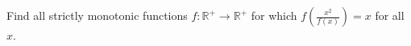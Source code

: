 Find all strictly monotonic functions \(f\colon  \mathbb{R}^+\to\mathbb{R}^+\) for which \(f\left(\frac{x^2}{f(x)}\right)=x\) for all \(x\).